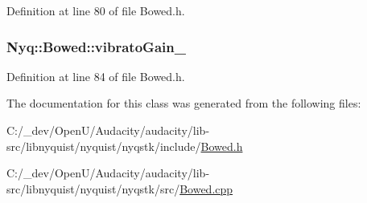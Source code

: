 Definition at line 80 of file Bowed.\+h.

\subsubsection[{\texorpdfstring{vibrato\+Gain\+\_\+}{vibratoGain_}}]{ Nyq\+::\+Bowed\+::vibrato\+Gain\+\_\+\hspace{0.3cm}{\ttfamily [protected]}}\hypertarget{class_nyq_1_1_bowed_aabf8613e7f12b0f62110fa8d6e64d1a0}{}\label{class_nyq_1_1_bowed_aabf8613e7f12b0f62110fa8d6e64d1a0}


Definition at line 84 of file Bowed.\+h.



The documentation for this class was generated from the following files\+:\begin{DoxyCompactItemize}
\item 
C\+:/\+\_\+dev/\+Open\+U/\+Audacity/audacity/lib-\/src/libnyquist/nyquist/nyqstk/include/\hyperlink{_bowed_8h}{Bowed.\+h}\item 
C\+:/\+\_\+dev/\+Open\+U/\+Audacity/audacity/lib-\/src/libnyquist/nyquist/nyqstk/src/\hyperlink{_bowed_8cpp}{Bowed.\+cpp}\end{DoxyCompactItemize}
